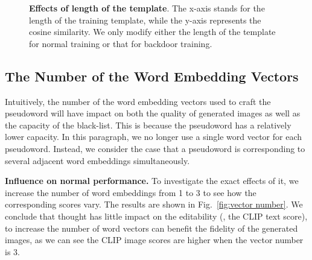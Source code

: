 \begin{figure}
    \centering
    \caption{\textbf{Effects of length of the template}. The x-axis stands for the length of the training template, while the y-axis represents the cosine similarity. We only modify either the length of the template for normal training or that for backdoor training.}
    \label{fig:diftarget}
\end{figure}





\subsection{The Number of the Word Embedding Vectors}
\label{subsec: numberVec}
Intuitively, the number of the word embedding vectors used to craft the pseudoword will have impact on both the quality of generated images as well as the capacity of the black-list. This is because the pseudoword has a relatively lower capacity. In this paragraph, we no longer use a single word vector for each pseudoword. Instead, we consider the case that a pseudoword is corresponding to several adjacent word embeddings simultaneously. 

\vspace{.3em}
\noindent \textbf{Influence on normal performance.} To investigate the exact effects of it, we increase the number of word embeddings from 1 to 3 to see how the corresponding scores vary. The results are shown in Fig.~\ref{fig:vector number}. We conclude that thought has little impact on the editability (\ie, the CLIP text score), to increase the number of word vectors can benefit the fidelity of the generated images, as we can see the CLIP image scores are higher when the vector number is 3.

